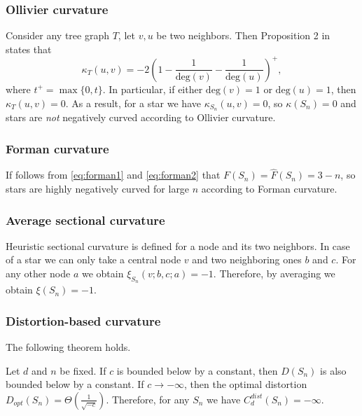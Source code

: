 \documentclass[runningheads]{llncs}
\begin{document}
\subsubsection{Ollivier curvature} 
Consider any tree graph $T$, let $v, u$ be two neighbors. Then Proposition 2 in~\cite{jost2014ollivier} states that
\begin{equation}\label{eq:ollivier_tree}
	\kappa_T(u,v) = -2\left(1 - \frac{1}{\mathrm{deg}(v)} - \frac{1}{\mathrm{deg}(u)}\right)^+, 
\end{equation}
where $t^+ = \max\{0,t\}$. In particular, if either $\mathrm{deg}(v) = 1$ or $\mathrm{deg}(u) = 1$, then $\kappa_T(u,v) = 0$.  As a result, for a star we have $\kappa_{S_n}(u,v) = 0$, so $\kappa(S_n) = 0$ and stars are \textit{not} negatively curved according to Ollivier curvature.

\subsubsection{Forman curvature}
If follows from \eqref{eq:forman1} and \eqref{eq:forman2} that
$F(S_n) = \hat F(S_n) = 3-n$, so stars are highly negatively curved for large $n$ according to Forman curvature.

\subsubsection{Average sectional curvature}

Heuristic sectional curvature is defined for a node and its two neighbors. In case of a star we can only take a central node $v$ and two neighboring ones $b$ and $c$. For any other node $a$ we obtain $\xi_{S_n}(v;b,c;a) = -1$. Therefore, by averaging we obtain $\xi(S_n) = -1$.
\subsubsection{Distortion-based curvature} 
The following theorem holds.

\begin{theorem}\label{thm:star_distortion}
Let $d$ and $n$ be fixed.
If $c$ is bounded below by a constant, then $D(S_n)$ is also bounded below by a constant. 
If $c \to -\infty$, then the optimal distortion $D_{opt}(S_n) = \Theta\left(\frac{1}{\sqrt{-c}}\right)$.
Therefore, for any $S_n$ we have $C_d^{dist}(S_n) = -\infty$.
\end{theorem}
\end{document}
